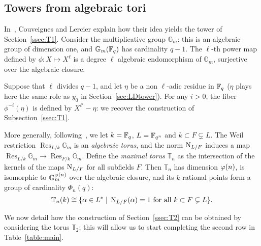 \documentclass{sig-alternate}
\DeclareMathOperator{\Res}{Res}
\begin{document}

\subsection{Towers from algebraic tori}
\label{ssec:fibers-T2}
In~\cite{couveignes+lercier11}, Couveignes and Lercier explain how
their idea yields the tower of Section~\ref{ssec:T1}. Consider the
multiplicative group $\mathbb{G}_m$: this is an algebraic group of
dimension one, and $\mathbb{G}_m(\mathbb{F}_q)$ has cardinality $q-1$.  The
$\ell$-th power map defined by $\phi:X\mapsto X^\ell$ is a degree
$\ell$ algebraic endomorphism of $\mathbb{G}_m$, surjective over the
algebraic closure.

Suppose that $\ell$ divides $q-1$, and let $\eta$ be a non $\ell$-adic
residue in $\mathbb{F}_q$ ($\eta$ plays here the same role as $y_0$ in
Section~\ref{sec:LDtower}). For any $i>0$, the fiber $\phi^{-i}(\eta)$
is defined by $X^{\ell^i}-\eta$: we recover the construction of
Subsection~\ref{ssec:T1}.

More generally, following~\cite{rubin+silverberg03,voskresenskii98},
we let $k=\mathbb{F}_q$, $L=\mathbb{F}_{q^n}$ and $k\subset F\subsetneq L$. The Weil
restriction $\Res_{L/k}\mathbb{G}_m$ is an \emph{algebraic torus}, and
the norm $\operatorname{N}_{L/F}$ induces a map
$\Res_{L/k}\mathbb{G}_m\to\Res_{F/k}\mathbb{G}_m$. Define the
\emph{maximal torus} $\mathbb{T}_n$ as the intersection of the kernels of the
maps $\operatorname{N}_{L/F}$ for all subfields $F$. Then $\mathbb{T}_n$ has dimension
$\varphi(n)$, is isomorphic to $\mathbb{G}_m^{\varphi(n)}$ over the
algebraic closure, and its $k$-rational points form a group of
cardinality $\Phi_n(q)$:
\begin{equation}
  \label{eq:Tn}
  \mathbb{T}_n(k) \cong \{\alpha\in L^\ast \;|\; \operatorname{N}_{L/F}(\alpha) = 1 
  \text{ for all $k\subset F\subsetneq L$} \}.
\end{equation}


We now detail how the construction of Section~\ref{ssec:T2} can be
obtained by considering the torus $\mathbb{T}_2$; this will allow us to start
completing the second row in Table~\ref{table:main}.
\end{document}
